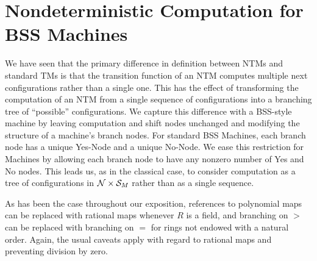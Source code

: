 \section{Nondeterministic Computation for BSS Machines}

We have seen that the primary difference in definition between NTMs
and standard TMs is that the transition function of an NTM computes
multiple next configurations rather than a single one.  This has the
effect of transforming the computation of an NTM from a single
sequence of configurations into a branching tree of ``possible''
configurations.  We capture this difference with a BSS-style machine
by leaving computation and shift nodes unchanged and modifying the
structure of a machine's branch nodes.  For standard BSS Machines,
each branch node has a unique Yes-Node and a unique No-Node.  We ease
this restriction for \ndet Machines by allowing each branch node to
have any nonzero number of Yes and No nodes.  This leads us, as in the
classical case, to consider computation as a tree of configurations in
$\mathcal{N} \times \mathcal{S}_M$ rather than as a single sequence.

As has been the case throughout our exposition, references to
polynomial maps can be replaced with rational maps whenever $R$ is a
field, and branching on $>$ can be replaced with branching on $=$ for
rings not endowed with a natural order.  Again, the usual caveats
apply with regard to rational maps and preventing division by zero.\\


